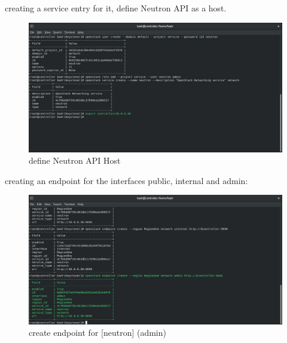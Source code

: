 \begin{spacing}{1.2}
\par creating a service entry for it, define Neutron API as a host.
\\
\begin{figure}[!htb] 
\begin{center} 
\includegraphics[width=1\linewidth]{Cloud/Neutron Setup in Keystone/define Neutron API Host} 
\end{center} 
\caption{define Neutron API Host} 
\end{figure} 
\FloatBarrier

\par creating an endpoint for the interfaces
public, internal and admin: 
\\
\begin{figure}[!htb] 
\begin{center} 
\includegraphics[width=1\linewidth]{Cloud/Neutron Setup in Keystone/create endpoint for [neutron] (admin)} 
\end{center} 
\caption{create endpoint for [neutron] (admin)} 
\end{figure} 
\FloatBarrier


\end{spacing}
